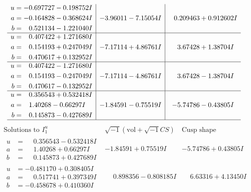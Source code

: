 \documentclass[1p]{elsarticle_modified}
\theoremstyle{definition}
\newcommand{\I}{\sqrt{-1}}
\begin{document}
$$\begin{array}{c|c|c}
\begin{aligned}
u &= -0.697727 - 0.198752 I \\
a &= -0.164828 - 0.368624 I \\
b &= \phantom{-}0.521134 - 1.221040 I\end{aligned}
 & -3.96011 - 7.15054 I & \phantom{-}0.209463 + 0.912602 I \\ \hline\begin{aligned}
u &= \phantom{-}0.407422 + 1.271680 I \\
a &= \phantom{-}0.154193 + 0.247049 I \\
b &= \phantom{-}0.470617 + 0.132952 I\end{aligned}
 & -7.17114 + 4.86761 I & \phantom{-}3.67428 + 1.38704 I \\ \hline\begin{aligned}
u &= \phantom{-}0.407422 - 1.271680 I \\
a &= \phantom{-}0.154193 - 0.247049 I \\
b &= \phantom{-}0.470617 - 0.132952 I\end{aligned}
 & -7.17114 - 4.86761 I & \phantom{-}3.67428 - 1.38704 I \\ \hline\begin{aligned}
u &= \phantom{-}0.356543 + 0.532418 I \\
a &= \phantom{-}1.40268 - 0.66297 I \\
b &= \phantom{-}0.145873 - 0.427689 I\end{aligned}
 & -1.84591 - 0.75519 I & -5.74786 - 0.43805 I\\
 \hline 
 \end{array}$$\newpage$$\begin{array}{c|c|c}  
\text{Solutions to }I^u_{1}& \I (\text{vol} + \sqrt{-1}CS) & \text{Cusp shape}\\
 \hline 
\begin{aligned}
u &= \phantom{-}0.356543 - 0.532418 I \\
a &= \phantom{-}1.40268 + 0.66297 I \\
b &= \phantom{-}0.145873 + 0.427689 I\end{aligned}
 & -1.84591 + 0.75519 I & -5.74786 + 0.43805 I \\ \hline\begin{aligned}
u &= -0.481170 + 0.308405 I \\
a &= \phantom{-}0.517741 + 0.397349 I \\
b &= -0.458678 + 0.410360 I\end{aligned}
 & \phantom{-}0.898356 - 0.808185 I & \phantom{-}6.63316 + 4.13450 I \\ \hline\begin{aligned}

\end{aligned}
\end{array}$$
\end{document}
